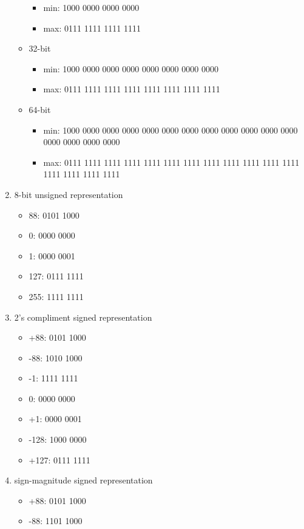 \documentclass{article}
\begin{document}
\begin{enumerate}
\begin{itemize}
\begin{itemize}
            \item min: 1000 0000 0000 0000
            \item max: 0111 1111 1111 1111
        \end{itemize}
        \item 32-bit
        \begin{itemize}
            \item min: 1000 0000 0000 0000 0000 0000 0000 0000
            \item max: 0111 1111 1111 1111 1111 1111 1111 1111
        \end{itemize}
        \item 64-bit
        \begin{itemize}
            \item min: 1000 0000 0000 0000 0000 0000 0000 0000 0000 0000 0000 0000 0000 0000 0000 0000
            \item max: 0111 1111 1111 1111 1111 1111 1111 1111 1111 1111 1111 1111 1111 1111 1111 1111
        \end{itemize}
    \end{itemize}
    \item 8-bit unsigned representation
    \begin{itemize}
        \item 88: 0101 1000
        \item 0: 0000 0000
        \item 1: 0000 0001
        \item 127: 0111 1111
        \item 255: 1111 1111
    \end{itemize}
    \item 2's compliment signed representation
    \begin{itemize}
        \item +88: 0101 1000
        \item -88: 1010 1000
        \item -1: 1111 1111
        \item 0: 0000 0000
        \item +1: 0000 0001
        \item -128: 1000 0000
        \item +127: 0111 1111
    \end{itemize}
    \item sign-magnitude signed representation
    \begin{itemize}
        \item +88: 0101 1000
        \item -88: 1101 1000

\end{itemize}
\end{enumerate}
\end{document}
